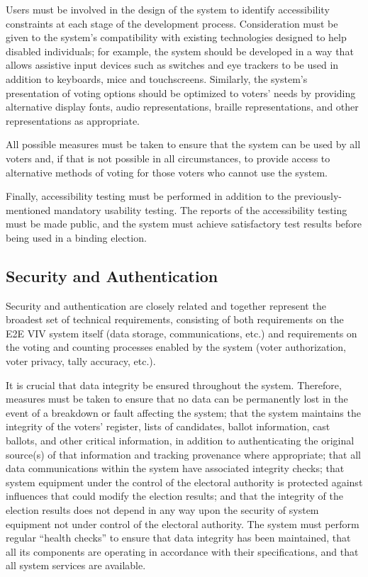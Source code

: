 Users must be involved in the design of the system to identify
accessibility constraints at each stage of the development
process. Consideration must be given to the system's compatibility
with existing technologies designed to help disabled individuals; for
example, the system should be developed in a way that allows assistive
input devices such as switches and eye trackers to be used in addition
to keyboards, mice and touchscreens. Similarly, the system's
presentation of voting options should be optimized to voters' needs by
providing alternative display fonts, audio representations, braille
representations, and other representations as appropriate.

All possible measures must be taken to ensure that the system can be
used by all voters and, if that is not possible in all circumstances,
to provide access to alternative methods of voting for those voters
who cannot use the system.

Finally, accessibility testing must be performed in addition to the
previously-mentioned mandatory usability testing. The reports of the
accessibility testing must be made public, and the system must achieve
satisfactory test results before being used in a binding election.

\subsection{Security and Authentication}

Security and authentication are closely related and together represent
the broadest set of technical requirements, consisting of both
requirements on the E2E VIV system itself (data storage,
communications, etc.) and requirements on the voting and counting
processes enabled by the system (voter authorization, voter privacy,
tally accuracy, etc.).

It is crucial that data integrity be ensured throughout the
system. Therefore, measures must be taken to ensure that no data can
be permanently lost in the event of a breakdown or fault affecting the
system; that the system maintains the integrity of the voters'
register, lists of candidates, ballot information, cast ballots, and
other critical information, in addition to authenticating the original
source(s) of that information and tracking provenance where
appropriate; that all data communications within the system have
associated integrity checks; that system equipment under the control
of the electoral authority is protected against influences that could
modify the election results; and that the integrity of the election
results does not depend in any way upon the security of system
equipment not under control of the electoral authority. The system
must perform regular ``health checks'' to ensure that data integrity
has been maintained, that all its components are operating in
accordance with their specifications, and that all system services are
available.

